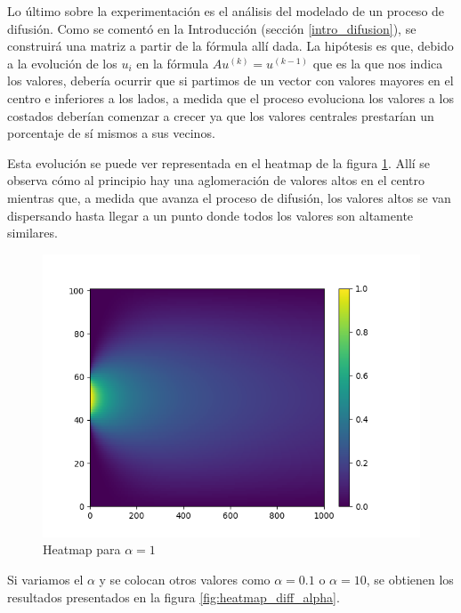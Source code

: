 Lo último sobre la experimentación es el análisis del modelado de un proceso de difusión.
Como se comentó en la Introducción (sección \ref{intro_difusion}), se construirá una matriz a partir de la fórmula allí dada.
La hipótesis es que, debido a la evolución de los $u_i$ en la fórmula $Au^{(k)} = u^{(k-1)}$ que es la que nos indica los valores, debería ocurrir que si partimos de un vector con valores mayores en el centro e inferiores a los lados, a medida que el proceso evoluciona los valores a los costados deberían comenzar a crecer ya que los valores centrales prestarían un porcentaje de sí mismos a sus vecinos.

Esta evolución se puede ver representada en el heatmap de la figura \ref{fig:heatmap_alpha_1}. Allí se observa cómo al principio hay una aglomeración de valores altos en el centro mientras que, a medida que avanza el proceso de difusión, los valores altos se van dispersando hasta llegar a un punto donde todos los valores son altamente similares.

\begin{figure}[H]   
      \centering
      \includegraphics[scale=0.5]{graficos/difusion-alpha1.png}
      \caption{Heatmap para $\alpha = 1$}
      \label{fig:heatmap_alpha_1}
\end{figure}

Si variamos el $\alpha$ y se colocan otros valores como $\alpha = 0.1$ o $\alpha = 10$, se obtienen los resultados presentados en la figura \ref{fig:heatmap_diff_alpha}.

